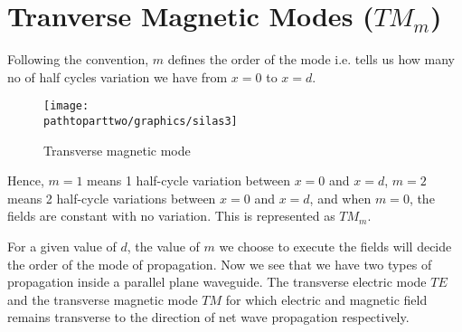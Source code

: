 \section{Tranverse Magnetic  Modes ($TM_m$)}
 Following the convention, $m$ defines the order of the mode i.e. tells us how many no of half cycles variation we have from $x = 0$ to $x = d$.
\begin{figure}[h]
\centering
\texttt{[image: \\pathtoparttwo/graphics/silas3]}
\caption{Transverse magnetic  mode}
\end{figure}
Hence, $ m = 1$ means 1 half-cycle variation between $x = 0$ and $x = d$, $m = 2$ means 2 half-cycle variations between $x = 0$ and $x = d$, and when $m = 0$, the fields are constant with no variation. This is represented as $TM_m$. 

For a given value of $d$, the value of $m$ we choose to execute the fields will decide the order of the mode of propagation. Now we see that we have two types of propagation inside a parallel plane waveguide. The transverse electric mode $TE$ and the transverse magnetic mode $TM$ for which electric and magnetic field remains transverse to the direction of net wave propagation respectively. 

